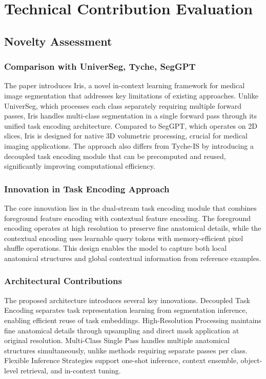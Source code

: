 \section{Technical Contribution Evaluation}
\label{sec:technical_contribution}

\subsection{Novelty Assessment}
\subsubsection{Comparison with UniverSeg, Tyche, SegGPT}
The paper introduces Iris, a novel in-context learning framework for medical image segmentation that addresses key limitations of existing approaches. Unlike UniverSeg, which processes each class separately requiring multiple forward passes, Iris handles multi-class segmentation in a single forward pass through its unified task encoding architecture. Compared to SegGPT, which operates on 2D slices, Iris is designed for native 3D volumetric processing, crucial for medical imaging applications. The approach also differs from Tyche-IS by introducing a decoupled task encoding module that can be precomputed and reused, significantly improving computational efficiency.

\subsubsection{Innovation in Task Encoding Approach}
The core innovation lies in the dual-stream task encoding module that combines foreground feature encoding with contextual feature encoding. The foreground encoding operates at high resolution to preserve fine anatomical details, while the contextual encoding uses learnable query tokens with memory-efficient pixel shuffle operations. This design enables the model to capture both local anatomical structures and global contextual information from reference examples.

\subsubsection{Architectural Contributions}
The proposed architecture introduces several key innovations. Decoupled Task Encoding separates task representation learning from segmentation inference, enabling efficient reuse of task embeddings. High-Resolution Processing maintains fine anatomical details through upsampling and direct mask application at original resolution. Multi-Class Single Pass handles multiple anatomical structures simultaneously, unlike methods requiring separate passes per class. Flexible Inference Strategies support one-shot inference, context ensemble, object-level retrieval, and in-context tuning.

